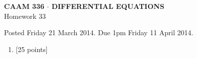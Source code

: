\documentclass[10pt]{article}
\begin{document}
\vspace*{-5em}
\begin{center}
\large \textsf{\textbf{CAAM 336 $\cdot$ DIFFERENTIAL EQUATIONS}\\[0.5em]
Homework 33 }
\end{center}

Posted Friday 21 March 2014.  Due 1pm Friday 11 April 2014.

\begin{enumerate}\addtocounter{enumi}{32}
\item {[25 points]}  
\end{enumerate}
\end{document}
